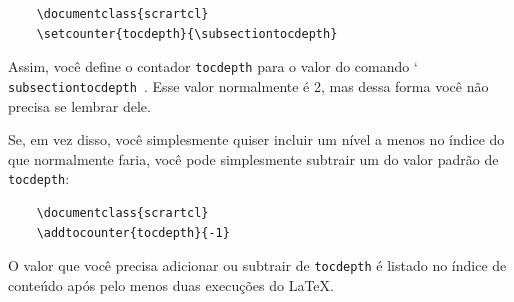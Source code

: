 \begin{verbatim}
    \documentclass{scrartcl}
    \setcounter{tocdepth}{\subsectiontocdepth}
\end{verbatim}

Assim, você define o contador \verb|tocdepth| para o valor do comando \char`\\\texttt{sub\-sec\-tion\-toc\-depth }. Esse valor normalmente é 2, mas dessa forma você não precisa se lembrar dele.

Se, em vez disso, você simplesmente quiser incluir um nível a menos no índice do que normalmente faria, você pode simplesmente subtrair um do valor padrão de \verb|tocdepth|:
\begin{verbatim}
    \documentclass{scrartcl}
    \addtocounter{tocdepth}{-1}
\end{verbatim}

O valor que você precisa adicionar ou subtrair de \texttt{tocdepth} é listado no índice de conteúdo após pelo menos duas execuções do \LaTeX.

